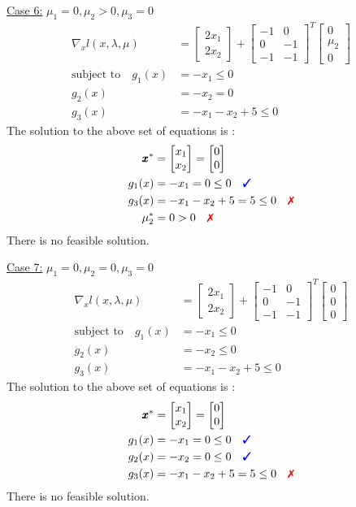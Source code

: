 \documentclass[a4paper,11pt]{article}
\newcommand{\V}[1]{\pmb{#1}}
\newcommand{\mat}[1]{\begin{bmatrix}#1\end{bmatrix}}
\newcommand{\cmark}{{\color{blue}\text{\ding{51}}}}%
\newcommand{\xmark}{{\color{red}\text{\ding{55}}}}%
\begin{document}
\noindent\underline{Case 6:} $\mu_1=0, \mu_2>0, \mu_3=0$
\begin{align*}
 \nabla_x l(x,\lambda,\mu) &= \mat{2x_1\\ 2x_2} +
\mat{-1& 0\\ 0& -1\\-1& -1}^T\mat{0\\ \mu_2\\ 0}\\
% 
 \text{subject to}\quad g_1(x)&=-x_1 \leq 0\\
 g_2(x)&=-x_2 = 0\\
 g_3(x)&= -x_1 -x_2 +5 \leq0 
\end{align*}
The solution to the above set of equations is :
\begin{align*}
 \V{x}^*&=\mat{x_1\\x_2} = \mat{0\\0}\\
 g_1(x)&=-x_1 =0\leq 0 \quad \cmark\\
 g_3(x)&= -x_1 -x_2 +5 = 5 \leq0 \quad \xmark\\
 \mu_2^*&= 0>0 \quad \xmark
\end{align*}
There is no feasible solution.

\noindent\underline{Case 7:} $\mu_1=0, \mu_2=0, \mu_3=0$
\begin{align*}
 \nabla_x l(x,\lambda,\mu) &= \mat{2x_1\\ 2x_2} +
\mat{-1& 0\\ 0& -1\\-1& -1}^T\mat{0\\ 0\\ 0}\\
% 
 \text{subject to}\quad g_1(x)&=-x_1 \leq 0\\
 g_2(x)&=-x_2 \leq 0\\
 g_3(x)&= -x_1 -x_2 +5 \leq0 
\end{align*}
The solution to the above set of equations is :
\begin{align*}
 \V{x}^*&=\mat{x_1\\x_2} = \mat{0\\0}\\
 g_1(x)&=-x_1 =0\leq 0 \quad \cmark\\
 g_2(x)&=-x_2 =0\leq 0 \quad \cmark\\
 g_3(x)&= -x_1 -x_2 +5 = 5 \leq0 \quad \xmark
\end{align*}
There is no feasible solution.
\end{document}
